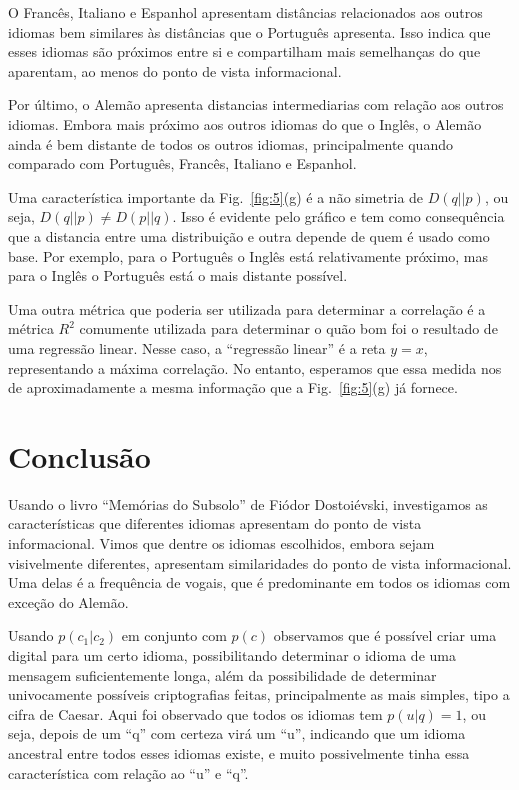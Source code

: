 \documentclass[aps, 10pt, twocolumn, prb, longbibliography, superscriptaddress]{revtex4-2}
\begin{document}
O Francês, Italiano e Espanhol apresentam distâncias
relacionados aos outros idiomas bem similares às distâncias
que o Português apresenta. Isso indica que esses idiomas são
próximos entre si e compartilham mais semelhanças do que aparentam,
ao menos do ponto de vista informacional.

Por último, o Alemão apresenta distancias
intermediarias com relação aos outros idiomas.
Embora mais próximo aos outros idiomas do que o
Inglês, o Alemão ainda é bem distante de todos
os outros idiomas, principalmente quando comparado com
Português, Francês, Italiano e Espanhol.

Uma característica importante da Fig.~\ref{fig:5}(g)
é a não simetria de $D(q||p)$, ou seja, $D(q||p)\neq D(p||q)$.
Isso é evidente pelo gráfico e tem como consequência que
a distancia entre uma distribuição e outra depende de
quem é usado como base. Por exemplo, para o Português
o Inglês está relativamente próximo, mas para o Inglês
o Português está o mais distante possível.

Uma outra métrica que poderia ser utilizada para determinar a
correlação é a métrica $R^2$ comumente utilizada para
determinar o quão bom foi o resultado de uma regressão linear.
Nesse caso, a ``regressão linear'' é a reta $y=x$, representando
a máxima correlação. No entanto, esperamos que essa medida
nos de aproximadamente a mesma informação que a Fig.~\ref{fig:5}(g)
já fornece.

\section{Conclusão}

Usando o livro ``Memórias do Subsolo'' de Fiódor Dostoiévski,
investigamos as características que diferentes idiomas
apresentam do ponto de vista informacional.
Vimos que dentre os idiomas escolhidos, embora
sejam visivelmente diferentes, apresentam similaridades do ponto
de vista informacional. Uma delas é a frequência de vogais, que
é predominante em todos os idiomas com exceção do Alemão.

Usando $p(c_1|c_2)$ em conjunto com $p(c)$
observamos que é possível criar uma digital para um certo idioma,
possibilitando determinar o idioma de uma mensagem suficientemente
longa, além da possibilidade de determinar univocamente possíveis
criptografias feitas, principalmente as mais simples, tipo a cifra de Caesar. Aqui foi observado que todos os idiomas tem $p(u|q)=1$, ou seja,
depois de um ``q'' com certeza virá um ``u'', indicando que um idioma
ancestral entre todos esses idiomas existe, e muito possivelmente
tinha essa característica com relação ao ``u'' e ``q''.
\end{document}
